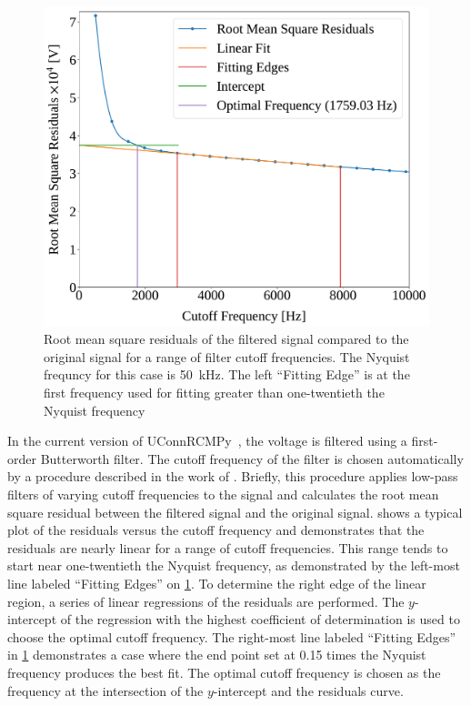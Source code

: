 \documentclass[12pt]{ussci}
\begin{document}
\begin{figure}[htbp]
\begin{minipage}[t]{0.48\textwidth}
        \includegraphics[width=\linewidth]{figures/residuals.pdf}
        \caption{Root mean square residuals of the filtered signal compared to
        the original signal for a range of filter cutoff frequencies. The
        Nyquist frequncy for this case is \SI{50}{\kHz}. The left ``Fitting
        Edge'' is at the first frequency used for fitting greater than
        one-twentieth the Nyquist frequency}
        \label{fig:residuals}
    \end{minipage}
\end{figure}

In the current version of UConnRCMPy~\autocite{uconnrcmpy}, the voltage is
filtered using a first-order Butterworth filter. The cutoff frequency of the
filter is chosen automatically by a procedure described in the work of
\textcite{Yu1999,Duarte2014}. Briefly, this procedure applies low-pass filters
of varying cutoff frequencies to the signal and calculates the root mean square
residual between the filtered signal and the original signal.
 shows a typical plot of the residuals versus the cutoff
frequency and demonstrates that the residuals are nearly linear for a range of
cutoff frequencies. This range tends to start near one-twentieth the Nyquist
frequency, as demonstrated by the left-most line labeled ``Fitting Edges'' on
\cref{fig:residuals}. To determine the right edge of the linear region, a series
of linear regressions of the residuals are performed. The $y$-intercept of the
regression with the highest coefficient of determination is used to choose the
optimal cutoff frequency. The right-most line labeled ``Fitting Edges'' in
\cref{fig:residuals} demonstrates a case where the end point set at \num{0.15}
times the Nyquist frequency produces the best fit. The optimal cutoff frequency
is chosen as the frequency at the intersection of the $y$-intercept and the
residuals curve.
\end{document}

